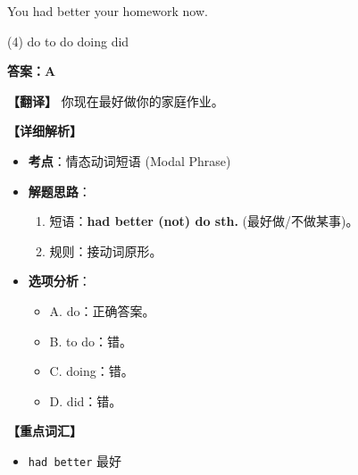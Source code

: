 \documentclass[11pt, a4paper]{article}
\newcommand{\analysis}[4]{
    \begin{solutionbox}
        \textbf{答案：#1}
        
        \textbf{【翻译】} #2
        
        \textbf{【详细解析】}
        #3
        
        \textbf{【重点词汇】}
        #4
    \end{solutionbox}
}
\newcommand{\blank}{\underline{\hspace{1.5cm}}}
\begin{document}
\begin{questions}
    \item You had better \blank your homework now.
    \begin{tasks}(4)
        \task do \task to do \task doing \task did
    \end{tasks}
    \analysis{A}{你现在最好做你的家庭作业。}{
        \begin{itemize}
            \item \textbf{考点}：情态动词短语 (Modal Phrase)
            \item \textbf{解题思路}：
                \begin{enumerate}
                    \item 短语：\textbf{had better (not) do sth.} (最好做/不做某事)。
                    \item 规则：接动词原形。
                \end{enumerate}
            \item \textbf{选项分析}：
                \begin{itemize}
                    \item A. do：正确答案。
                    \item B. to do：错。
                    \item C. doing：错。
                    \item D. did：错。
                \end{itemize}
        \end{itemize}
    }{
        \begin{itemize}
            \item \texttt{had better} 最好
        \end{itemize}
    }


\end{questions}
\end{document}
